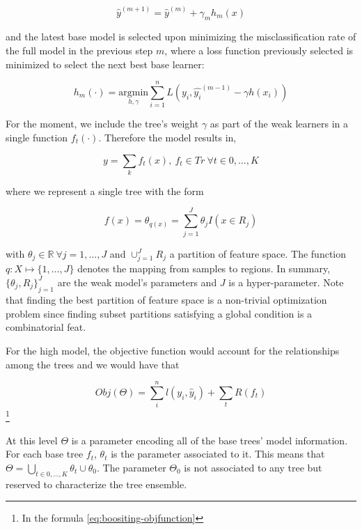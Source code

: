 \begin{equation}
\hat{y}^{(m+1)} =  \hat{y}^{(m)} + \gamma_m h_m(x)
\end{equation}

and the latest base model is selected upon minimizing the misclassification rate of the full model in the previous step $m$, where a loss function previously selected is minimized to select the next best base learner:

\begin{equation}
h_m(\cdot) = \underset{h,\gamma}{\mathrm{argmin}}  \sum_{i=1}^{n} L ( y_i, \hat{y_i}^{(m-1)} - \gamma h(x_i) )
\end{equation}


For the moment, we include the tree's weight $\gamma$ as part of the weak learners in a single function $f_t(\cdot)$. Therefore the model results in,

\begin{equation}
y = \sum_k f_t(x) , \ f_t \in Tr \ \forall t \in {0,\ldots,K}
\end{equation}

where we represent a single tree with the form

\begin{equation}
f(x) = \theta_{q(x)} = \sum_{j=1}^J \theta_j I(x \in R_j)
\end{equation}

with $\theta_j \in \mathbb{R} \ \forall j = 1,\ldots,J$ and $ \cup_{j=1}^J R_j$ a partition of feature space. The function $q : X \mapsto \{1,\ldots,J\}$ denotes the mapping from samples to regions. In summary, ${\{\theta_j, R_j\}}_{j=1}^J$ are the weak model's parameters and $J$ is a hyper-parameter. Note that finding the best partition of feature space is a non-trivial optimization problem since finding subset partitions satisfying a global condition is a combinatorial feat.

For the high model, the objective function would account for the relationships among the trees and we would have that

\begin{equation}
Obj(\Theta) = \sum_i^n l(y_i,\hat{y}_i) + \sum_t R(f_t)
\end{equation}\label{eq:boositing-objfunction}\footnote{In the formula \cref{eq:boositing-objfunction} }

At this level $\Theta$ is a parameter encoding all of the base trees' model information. For each base tree $f_t$, $\theta_t$ is the parameter associated to it. This means that $\Theta = \bigcup_{t \in {0,\ldots,K}} \theta_t \cup \theta_0$. The parameter $\Theta_0$ is not associated to any tree but reserved to characterize the tree ensemble.

